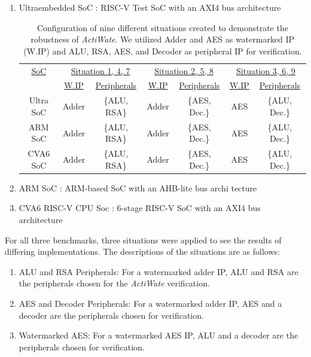 \documentclass[onecolumn]{IEEEtran}
\begin{document}
\begin{enumerate}
	\item Ultraembedded SoC \cite{RISC-V2024}: RISC-V Test SoC with an AXI4 bus
	architecture
	
	\begin{table}[h!]
		\centering
		\caption{ Configuration of nine different situations created to demonstrate
			the robustness of \textit{ActiWate}. We utilized Adder and AES as watermarked IP
			(W.IP) and ALU, RSA, AES, and Decoder as peripheral IP for verification.}
		\captionsetup{position=above}
		\label{t1}
		\begin{tabular}{c c c c c c c} 
			\hline
			\underline{SoC} & \multicolumn{2}{c}{\underline{Situation 1, 4, 7}} & \multicolumn{2}{c}{\underline{Situation 2, 5, 8}} & \multicolumn{2}{c}{\underline{Situation 3, 6, 9}} \\ 
			& \underline{W.IP} & \underline{Peripherals} & \underline{W.IP} & \underline{Peripherals} & \underline{W.IP} & \underline{Peripherals} \\ 
			Ultra SoC & Adder & \{ALU, RSA\} & Adder & \{AES, Dec.\} & AES & \{ALU, Dec.\} \\ 
			ARM SoC & Adder & \{ALU, RSA\} & Adder & \{AES, Dec.\} & AES & \{ALU, Dec.\} \\ 
			CVA6 SoC & Adder & \{ALU, RSA\} & Adder & \{AES, Dec.\} & AES & \{ALU, Dec.\} \\ 
			\hline
		\end{tabular}
		

	\end{table}
			
	\item ARM SoC \cite{or1200_soc}: ARM-based SoC with an AHB-lite bus archi
	tecture
	
	\item CVA6 RISC-V CPU Soc \cite{CVA62024}: 6-stage RISC-V SoC with an
	AXI4 bus architecture \\
\end{enumerate}

For all three benchmarks, three situations were applied to see the
results of differing implementations. The descriptions of the situations
are as follows:

\begin{enumerate}
	\item ALU and RSA Peripherals: For a watermarked adder IP, ALU
	and RSA are the peripherals chosen for the \textit{ActiWate} verification.
	\item AES and Decoder Peripherals: For a watermarked adder IP, AES
	and a decoder are the peripherals chosen for verification.
	\item Watermarked AES: For a watermarked AES IP, ALU and a
	decoder are the peripherals chosen for verification.\\
\end{enumerate}
\end{document}
